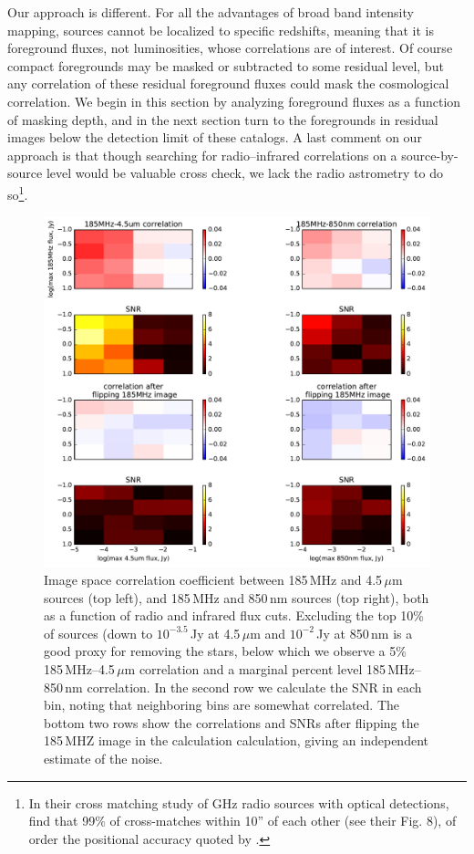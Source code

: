 \documentclass{emulateapj}
\begin{document}
Our approach is different. For all the advantages of broad band intensity mapping, sources cannot be localized to specific redshifts, meaning that it is foreground fluxes, not luminosities, whose correlations are of interest. Of course compact foregrounds may be masked or subtracted to some residual level, but any correlation of these residual foreground fluxes could mask the cosmological correlation. We begin in this section by analyzing foreground fluxes as a function of masking depth, and in the next section turn to the foregrounds in residual images below the detection limit of these catalogs. A last comment on our approach is that though searching for radio--infrared correlations on a source-by-source level would be valuable cross check, we lack the radio astrometry to do so\footnote{In their cross matching study of GHz radio sources with optical detections, \citep{mcmahon02} find that 99\% of cross-matches within 10'' of each other (see their Fig. 8), of order the positional accuracy quoted by \citet{PattiCatalog1}.}. 

\begin{figure}[h]
\centering
\includegraphics[width=5.5in]{images/source_correlation_grids_and_snrs.pdf}
\caption{Image space correlation coefficient between 185\,MHz and 4.5\,$\mu$m sources (top left), and 185\,MHz and 850\,nm sources (top right), both as a function of radio and infrared flux cuts. Excluding the top 10\% of sources (down to $10^{-3.5}$\,Jy at 4.5\,$\mu$m and $10^{-2}$\,Jy at 850\,nm is a good proxy for removing the stars, below which we observe a 5\% 185\,MHz--4.5\,$\mu$m correlation and a marginal percent level 185\,MHz--850\,nm correlation. In the second row we calculate the SNR in each bin, noting that neighboring bins are somewhat correlated. The bottom two rows show the correlations and SNRs after flipping the 185\,MHZ image in the calculation calculation, giving an independent estimate of the noise.}
\label{fig:correlationsandSNRs}
\end{figure}
\end{document}
